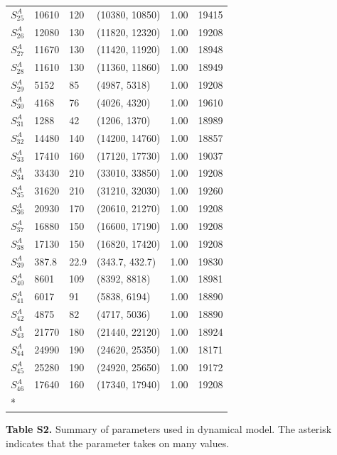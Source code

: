 \documentclass[
]{article}
\begin{document}
\begin{longtable}{llllrr}
\addlinespace
$S^A_{25}$ & 10610 & 120 & (10380, 10850) & 1.00 & 19415\\
$S^A_{26}$ & 12080 & 130 & (11820, 12320) & 1.00 & 19208\\
$S^A_{27}$ & 11670 & 130 & (11420, 11920) & 1.00 & 18948\\
$S^A_{28}$ & 11610 & 130 & (11360, 11860) & 1.00 & 18949\\
$S^A_{29}$ & 5152 & 85 & (4987, 5318) & 1.00 & 19208\\
\addlinespace
$S^A_{30}$ & 4168 & 76 & (4026, 4320) & 1.00 & 19610\\
$S^A_{31}$ & 1288 & 42 & (1206, 1370) & 1.00 & 18989\\
$S^A_{32}$ & 14480 & 140 & (14200, 14760) & 1.00 & 18857\\
$S^A_{33}$ & 17410 & 160 & (17120, 17730) & 1.00 & 19037\\
$S^A_{34}$ & 33430 & 210 & (33010, 33850) & 1.00 & 19208\\
\addlinespace
$S^A_{35}$ & 31620 & 210 & (31210, 32030) & 1.00 & 19260\\
$S^A_{36}$ & 20930 & 170 & (20610, 21270) & 1.00 & 19208\\
$S^A_{37}$ & 16880 & 150 & (16600, 17190) & 1.00 & 19208\\
$S^A_{38}$ & 17130 & 150 & (16820, 17420) & 1.00 & 19208\\
$S^A_{39}$ & 387.8 & 22.9 & (343.7, 432.7) & 1.00 & 19830\\
\addlinespace
$S^A_{40}$ & 8601 & 109 & (8392, 8818) & 1.00 & 18981\\
$S^A_{41}$ & 6017 & 91 & (5838, 6194) & 1.00 & 18890\\
$S^A_{42}$ & 4875 & 82 & (4717, 5036) & 1.00 & 18890\\
$S^A_{43}$ & 21770 & 180 & (21440, 22120) & 1.00 & 18924\\
$S^A_{44}$ & 24990 & 190 & (24620, 25350) & 1.00 & 18171\\
\addlinespace
$S^A_{45}$ & 25280 & 190 & (24920, 25650) & 1.00 & 19172\\
$S^A_{46}$ & 17640 & 160 & (17340, 17940) & 1.00 & 19208\\*
\end{longtable}
\newpage

\textbf{Table S2.} Summary of parameters used in dynamical model. The
asterisk indicates that the parameter takes on many values.
\end{document}
